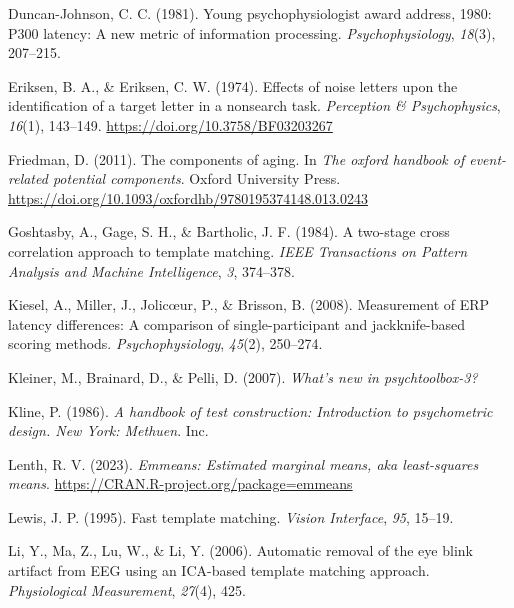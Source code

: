 \documentclass[
  man]{apa7}
\newlength{\cslhangindent}
\newlength{\cslentryspacingunit} %
\newenvironment{CSLReferences}[2] %
 {%
  \setlength{\parindent}{0pt}
  \ifodd #1
  \let\oldpar\par
  \def\par{\hangindent=\cslhangindent\oldpar}
  \fi
  \setlength{\parskip}{#2\cslentryspacingunit}
 }%
 {}
\begin{document}
\begin{CSLReferences}{1}{0}
\leavevmode{}%
Duncan-Johnson, C. C. (1981). Young psychophysiologist award address, 1980: {P300} latency: A new metric of information processing. \emph{Psychophysiology}, \emph{18}(3), 207--215.

\leavevmode{}%
Eriksen, B. A., \& Eriksen, C. W. (1974). Effects of noise letters upon the identification of a target letter in a nonsearch task. \emph{Perception \& Psychophysics}, \emph{16}(1), 143--149. \url{https://doi.org/10.3758/BF03203267}

\leavevmode{}%
Friedman, D. (2011). The components of aging. In \emph{The oxford handbook of event-related potential components}. Oxford University Press. \url{https://doi.org/10.1093/oxfordhb/9780195374148.013.0243}

\leavevmode{}%
Goshtasby, A., Gage, S. H., \& Bartholic, J. F. (1984). A two-stage cross correlation approach to template matching. \emph{IEEE Transactions on Pattern Analysis and Machine Intelligence}, \emph{3}, 374--378.

\leavevmode{}%
Kiesel, A., Miller, J., Jolicœur, P., \& Brisson, B. (2008). Measurement of {ERP} latency differences: {A} comparison of single-participant and jackknife-based scoring methods. \emph{Psychophysiology}, \emph{45}(2), 250--274.

\leavevmode{}%
Kleiner, M., Brainard, D., \& Pelli, D. (2007). \emph{What's new in psychtoolbox-3?}

\leavevmode{}%
Kline, P. (1986). \emph{A handbook of test construction: {Introduction} to psychometric design. {New} {York}: {Methuen}}. Inc.

\leavevmode{}%
Lenth, R. V. (2023). \emph{Emmeans: Estimated marginal means, aka least-squares means}. \url{https://CRAN.R-project.org/package=emmeans}

\leavevmode{}%
Lewis, J. P. (1995). Fast template matching. \emph{Vision Interface}, \emph{95}, 15--19.

\leavevmode{}%
Li, Y., Ma, Z., Lu, W., \& Li, Y. (2006). Automatic removal of the eye blink artifact from {EEG} using an {ICA}-based template matching approach. \emph{Physiological Measurement}, \emph{27}(4), 425.


\end{CSLReferences}
\end{document}
